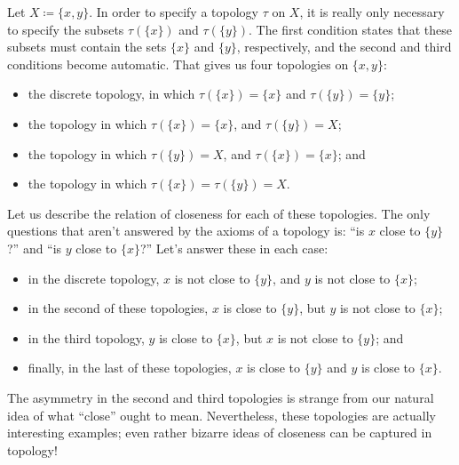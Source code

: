 \begin{exm}%
	\label{topologiesontwopointset}
	Let $ X \coloneq \{ x , y \} $.
	In order to specify a topology $ \tau $ on $ X $, it is really only necessary to specify the subsets $ \tau ( \{ x \} ) $ and $ \tau ( \{ y \} ) $.
	The first condition states that these subsets must contain the sets $ \{ x \} $ and $ \{ y \} $, respectively, and the second and third conditions become automatic.
	That gives us four topologies on $ \{ x, y \} $:
	\begin{itemize}
		\item the discrete topology, in which $ \tau( \{ x \} ) = \{ x \} $ and $ \tau( \{ y \} ) = \{ y \} $;
		\item the topology in which $ \tau( \{ x \} ) = \{ x \}$, and $ \tau( \{ y \} ) = X $; 
		\item the topology in which $ \tau( \{ y \} ) = X $, and $ \tau( \{ x \} ) = \{ x \} $; and
		\item the topology in which $ \tau( \{ x \} ) = \tau( \{ y \} ) = X $.
	\end{itemize}

	Let us describe the relation of closeness for each of these topologies.
	The only questions that aren't answered by the axioms of a topology is: \enquote{is $ x $ close to $ \{ y \} $?} and \enquote{is $ y $ close to $ \{ x \} $?}
	Let's answer these in each case:
	\begin{itemize}
		\item in the discrete topology, $ x $ is not close to $ \{ y \} $, and $ y $ is not close to $ \{ x \} $;
		\item in the second of these topologies, $ x $ is close to $ \{ y \} $, but $ y $ is not close to $ \{ x \} $;
		\item in the third topology, $ y $ is close to $ \{ x \} $, but $ x $ is not close to $ \{ y \} $; and
		\item finally, in the last of these topologies, $ x $ is close to $ \{ y \} $ and $ y $ is close to $ \{ x \} $.
\end{itemize}

	The asymmetry in the second and third topologies is strange from our natural idea of what \enquote{close} ought to mean.
Nevertheless, these topologies are actually interesting examples;
even rather bizarre ideas of closeness can be captured in topology!


\end{exm}
